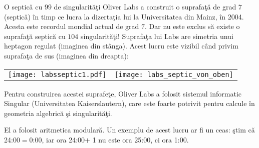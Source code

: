 \begin{surferPage}{O septic\u{a} cu 99 de singularit\u{a}\c{t}i}
     Oliver Labs a construit o suprafa\c{t}\u{a} de grad $7$ (septic\u{a}) \^{i}n timp ce lucra la
    dizerta\c{t}ia lui la Universitatea din Mainz, \^{i}n 2004. Acesta este recordul mondial actual
    de grad $7$. Dar nu este exclus s\u{a} existe o suprafa\c{t}\u{a} septic\u{a} cu $104$ singularit\u{a}\c{t}i!
    Suprafa\c{t}a lui Labs are simetria unui heptagon regulat (imaginea din st\^{a}nga).
    Acest lucru este vizibil c\^{a}nd privim suprafa\c{t}a de sus (imaginea din dreapta):

    \vspace*{-0.3em}
    \begin{center}
      \begin{tabular}{c@{\qquad}c}
        \texttt{[image: labsseptic1.pdf]}
        &
        \texttt{[image: labs\_septic\_von\_oben]}
      \end{tabular}
    \end{center}
    \vspace*{-0.3em}

    Pentru construirea acestei suprafe\c{t}e, Oliver Labs a folosit sistemul informatic
    {\sc Singular} (Universitatea Kaiserslautern), care este foarte potrivit pentru
    calcule \^{i}n geometria algebric\u{a} \c{s}i singularit\u{a}\c{t}i.

    El a folosit aritmetica modular\u{a}. Un exemplu de acest lucru ar fi un ceas: \c{s}tim c\u{a} 24:00$=$0:00,
    iar ora 24:00$+$ 1 nu este ora 25:00, ci ora 1:00.
\end{surferPage}

